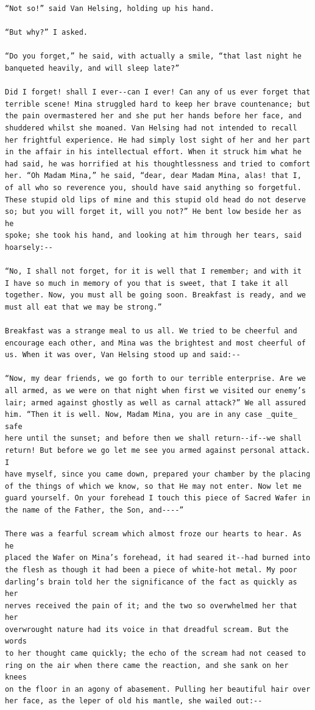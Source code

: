 \documentclass{article}
\begin{document}
\begin{verbatim}
“Not so!” said Van Helsing, holding up his hand.

“But why?” I asked.

“Do you forget,” he said, with actually a smile, “that last night he
banqueted heavily, and will sleep late?”

Did I forget! shall I ever--can I ever! Can any of us ever forget that
terrible scene! Mina struggled hard to keep her brave countenance; but
the pain overmastered her and she put her hands before her face, and
shuddered whilst she moaned. Van Helsing had not intended to recall
her frightful experience. He had simply lost sight of her and her part
in the affair in his intellectual effort. When it struck him what he
had said, he was horrified at his thoughtlessness and tried to comfort
her. “Oh Madam Mina,” he said, “dear, dear Madam Mina, alas! that I,
of all who so reverence you, should have said anything so forgetful.
These stupid old lips of mine and this stupid old head do not deserve
so; but you will forget it, will you not?” He bent low beside her as he
spoke; she took his hand, and looking at him through her tears, said
hoarsely:--

“No, I shall not forget, for it is well that I remember; and with it
I have so much in memory of you that is sweet, that I take it all
together. Now, you must all be going soon. Breakfast is ready, and we
must all eat that we may be strong.”

Breakfast was a strange meal to us all. We tried to be cheerful and
encourage each other, and Mina was the brightest and most cheerful of
us. When it was over, Van Helsing stood up and said:--

“Now, my dear friends, we go forth to our terrible enterprise. Are we
all armed, as we were on that night when first we visited our enemy’s
lair; armed against ghostly as well as carnal attack?” We all assured
him. “Then it is well. Now, Madam Mina, you are in any case _quite_ safe
here until the sunset; and before then we shall return--if--we shall
return! But before we go let me see you armed against personal attack. I
have myself, since you came down, prepared your chamber by the placing
of the things of which we know, so that He may not enter. Now let me
guard yourself. On your forehead I touch this piece of Sacred Wafer in
the name of the Father, the Son, and----”

There was a fearful scream which almost froze our hearts to hear. As he
placed the Wafer on Mina’s forehead, it had seared it--had burned into
the flesh as though it had been a piece of white-hot metal. My poor
darling’s brain told her the significance of the fact as quickly as her
nerves received the pain of it; and the two so overwhelmed her that her
overwrought nature had its voice in that dreadful scream. But the words
to her thought came quickly; the echo of the scream had not ceased to
ring on the air when there came the reaction, and she sank on her knees
on the floor in an agony of abasement. Pulling her beautiful hair over
her face, as the leper of old his mantle, she wailed out:--


\end{verbatim}
\end{document}
